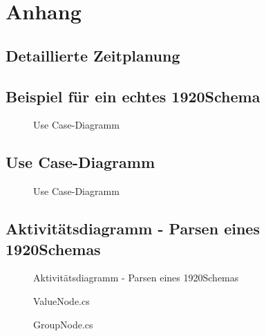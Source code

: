 \section{Anhang}
\subsection{Detaillierte Zeitplanung}
\label{app:Zeitplanung}


\clearpage
\subsection{Beispiel für ein echtes 1920Schema}
\label{app:RealSchema}
\begin{figure}[htb]
\centering
{}
\caption{Use Case-Diagramm}
\end{figure}

\clearpage


\subsection{Use Case-Diagramm}
\label{app:UseCase}
\begin{figure}[htb]
\centering
{}
\caption{Use Case-Diagramm}
\end{figure}
\clearpage


\clearpage

\subsection{Aktivitätsdiagramm - Parsen eines 1920Schemas}
\label{app:AktivitaetsdiagrammSchemaParsen}
\begin{figure}[htb]
\centering
{}
\caption{Aktivitätsdiagramm - Parsen eines 1920Schemas}
\end{figure}

\clearpage
\label{app:ValueNodeSrc}
\begin{figure}[htb]
\centering
{}
\caption{ValueNode.cs}
\end{figure}
\clearpage


\label{app:GroupNodeSrc}
\begin{figure}[htb]
\centering
{}
\caption{GroupNode.cs}
\end{figure}
\clearpage



